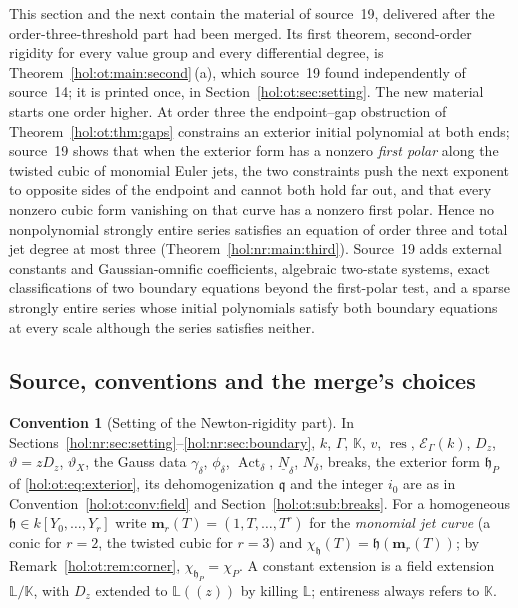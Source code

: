 \documentclass[11pt]{article}
\numberwithin{equation}{section}
\theoremstyle{definition}
\newtheorem{convention}[theorem]{Convention}
\theoremstyle{remark}
\newcommand{\res}{\operatorname{res}}
\newcommand{\KK}{\mathbb K}
\newcommand{\EK}{\mathcal E_\Gamma(k)}
\begin{document}
This section and the next contain the material of source~19, delivered after
the order-three-threshold part had been merged. Its first theorem, second-order
rigidity for every value group and every differential degree, is
Theorem~\ref{hol:ot:main:second}\,(a), which source~19 found independently of
source~14; it is printed once, in Section~\ref{hol:ot:sec:setting}. The new
material starts one order higher. At order three the endpoint--gap
obstruction of Theorem~\ref{hol:ot:thm:gaps} constrains an exterior initial
polynomial at both ends; source~19 shows that when the exterior form has a
nonzero \emph{first polar} along the twisted cubic of monomial Euler jets, the
two constraints push the next exponent to opposite sides of the endpoint and
cannot both hold far out, and that every nonzero cubic form vanishing on that
curve has a nonzero first polar. Hence no nonpolynomial strongly entire series
satisfies an equation of order three and total jet degree at most three
(Theorem~\ref{hol:nr:main:third}). Source~19 adds external constants and
Gaussian-omnific coefficients, algebraic two-state systems, exact
classifications of two boundary equations beyond the first-polar test, and a
sparse strongly entire series whose initial polynomials satisfy both boundary
equations at every scale although the series satisfies neither.

\subsection{Source, conventions and the merge's choices}
\label{hol:nr:sub:conventions}

\begin{convention}[Setting of the Newton-rigidity part]
\label{hol:nr:conv:field}
In Sections~\ref{hol:nr:sec:setting}--\ref{hol:nr:sec:boundary}, $k$, $\Gamma$,
$\KK$, $v$, $\res$, $\EK$, $D_z$, $\vartheta=zD_z$, $\vartheta_X$, the Gauss data
$\gamma_\delta$, $\phi_\delta$, $\operatorname{Act}_\delta$,
$\underline N_\delta$, $N_\delta$, breaks, the exterior form $\mathfrak h_P$ of
\eqref{hol:ot:eq:exterior}, its dehomogenization $\mathfrak q$ and the
integer $i_0$ are as in Convention~\ref{hol:ot:conv:field} and
Section~\ref{hol:ot:sub:breaks}. For a homogeneous
$\mathfrak h\in k[Y_0,\ldots,Y_r]$ write
$\mathbf m_r(T)=(1,T,\ldots,T^r)$ for the \emph{monomial jet curve} (a conic
for $r=2$, the twisted cubic for $r=3$) and
$\chi_{\mathfrak h}(T)=\mathfrak h(\mathbf m_r(T))$; by
Remark~\ref{hol:ot:rem:corner}, $\chi_{\mathfrak h_P}=\chi_P$. A constant
extension is a field extension $\mathbb L/\KK$, with $D_z$ extended to
$\mathbb L((z))$ by killing $\mathbb L$; entireness always refers to $\KK$.
\end{convention}
\end{document}
